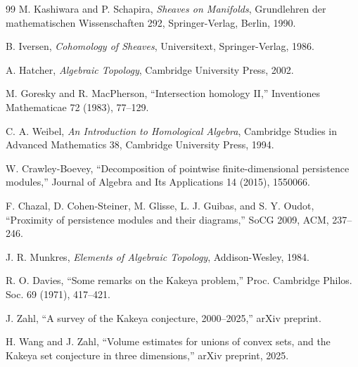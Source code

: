 \documentclass[11pt,a4paper]{article}
\theoremstyle{remark}
\begin{document}
		\begin{thebibliography}{99}
		M. Kashiwara and P. Schapira,
		\textit{Sheaves on Manifolds},
		Grundlehren der mathematischen Wissenschaften 292,
		Springer-Verlag, Berlin, 1990.
		
		B. Iversen,
		\textit{Cohomology of Sheaves},
		Universitext, Springer-Verlag, 1986.
		
		A. Hatcher,
		\textit{Algebraic Topology},
		Cambridge University Press, 2002.
		
		M. Goresky and R. MacPherson,
		``Intersection homology II,''
		Inventiones Mathematicae 72 (1983), 77--129.
		
		C. A. Weibel,
		\textit{An Introduction to Homological Algebra},
		Cambridge Studies in Advanced Mathematics 38,
		Cambridge University Press, 1994.
		
		W. Crawley-Boevey,
		``Decomposition of pointwise finite-dimensional persistence modules,''
		Journal of Algebra and Its Applications 14 (2015), 1550066.
		
		F. Chazal, D. Cohen-Steiner, M. Glisse, L. J. Guibas, and S. Y. Oudot,
		``Proximity of persistence modules and their diagrams,''
		SoCG 2009, ACM, 237--246.
		
		J. R. Munkres,
		\textit{Elements of Algebraic Topology},
		Addison-Wesley, 1984.
		
		R. O. Davies,
		``Some remarks on the Kakeya problem,''
		Proc. Cambridge Philos. Soc. 69 (1971), 417--421.
		
		J. Zahl,
		``A survey of the Kakeya conjecture, 2000--2025,''
		arXiv preprint.
		
		H. Wang and J. Zahl,
		``Volume estimates for unions of convex sets, and the Kakeya set conjecture in three dimensions,''
		arXiv preprint, 2025.
		\end{thebibliography}
		
		
\end{document}
